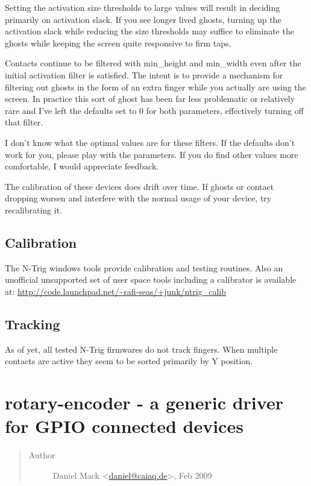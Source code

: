 \documentclass[a4paper,8pt,english]{sphinxmanual}
\begin{document}
Setting the activation size thresholds to large values will result in deciding
primarily on activation slack.  If you see longer lived ghosts, turning up the
activation slack while reducing the size thresholds may suffice to eliminate
the ghosts while keeping the screen quite responsive to firm taps.

Contacts continue to be filtered with min\_height and min\_width even after
the initial activation filter is satisfied.  The intent is to provide
a mechanism for filtering out ghosts in the form of an extra finger while
you actually are using the screen.  In practice this sort of ghost has
been far less problematic or relatively rare and I've left the defaults
set to 0 for both parameters, effectively turning off that filter.

I don't know what the optimal values are for these filters.  If the defaults
don't work for you, please play with the parameters.  If you do find other
values more comfortable, I would appreciate feedback.

The calibration of these devices does drift over time.  If ghosts or contact
dropping worsen and interfere with the normal usage of your device, try
recalibrating it.


\subsection{Calibration}
\label{input/devices/ntrig:calibration}
The N-Trig windows tools provide calibration and testing routines.  Also an
unofficial unsupported set of user space tools including a calibrator is
available at:
\href{http://code.launchpad.net/~rafi-seas/+junk/ntrig\_calib}{http://code.launchpad.net/\textasciitilde{}rafi-seas/+junk/ntrig\_calib}


\subsection{Tracking}
\label{input/devices/ntrig:tracking}
As of yet, all tested N-Trig firmwares do not track fingers.  When multiple
contacts are active they seem to be sorted primarily by Y position.


\section{rotary-encoder - a generic driver for GPIO connected devices}
\label{input/devices/rotary-encoder::doc}\label{input/devices/rotary-encoder:rotary-encoder-a-generic-driver-for-gpio-connected-devices}\begin{quote}\begin{description}
\item[{Author}] \leavevmode
Daniel Mack \textless{}\href{mailto:daniel@caiaq.de}{daniel@caiaq.de}\textgreater{}, Feb 2009

\end{description}\end{quote}
\end{document}
